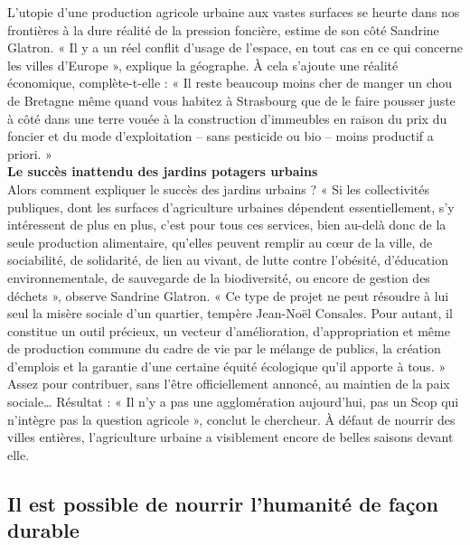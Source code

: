 \documentclass[8pt]{article}
\begin{document}
L’utopie d’une production agricole urbaine aux vastes surfaces se heurte dans nos frontières à la dure réalité de la pression foncière, estime de son côté Sandrine Glatron. « Il y a un réel conflit d’usage de l’espace, en tout cas en ce qui concerne les villes d’Europe », explique la géographe. À cela s’ajoute une réalité économique, complète-t-elle : « Il reste beaucoup moins cher de manger un chou de Bretagne même quand vous habitez à Strasbourg que de le faire pousser juste à côté dans une terre vouée à la construction d’immeubles en raison du prix du foncier et du mode d’exploitation – sans pesticide ou bio – moins productif a priori. »\\


\textbf{Le succès inattendu des jardins potagers urbains}\\

Alors comment expliquer le succès des jardins urbains ? « Si les collectivités publiques, dont les surfaces d’agriculture urbaines dépendent essentiellement, s’y intéressent de plus en plus, c’est pour tous ces services, bien au-delà donc de la seule production alimentaire, qu’elles peuvent remplir au cœur de la ville, de sociabilité, de solidarité, de lien au vivant, de lutte contre l’obésité, d’éducation environnementale, de sauvegarde de la biodiversité, ou encore de gestion des déchets », observe Sandrine Glatron. « Ce type de projet ne peut résoudre à lui seul la misère sociale d’un quartier, tempère Jean-Noël Consales. Pour autant, il constitue un outil précieux, un vecteur d’amélioration, d’appropriation et même de production commune du cadre de vie par le mélange de publics, la création d’emplois et la garantie d’une certaine équité écologique qu’il apporte à tous. » Assez pour contribuer, sans l’être officiellement annoncé, au maintien de la paix sociale… Résultat : « Il n’y a pas une agglomération aujourd’hui, pas un Scop qui n’intègre pas la question agricole », conclut le chercheur. À défaut de nourrir des villes entières, l’agriculture urbaine a visiblement encore de belles saisons devant elle.\\


\newpage
\subsection{Il est possible de nourrir l’humanité de façon durable}
\end{document}
